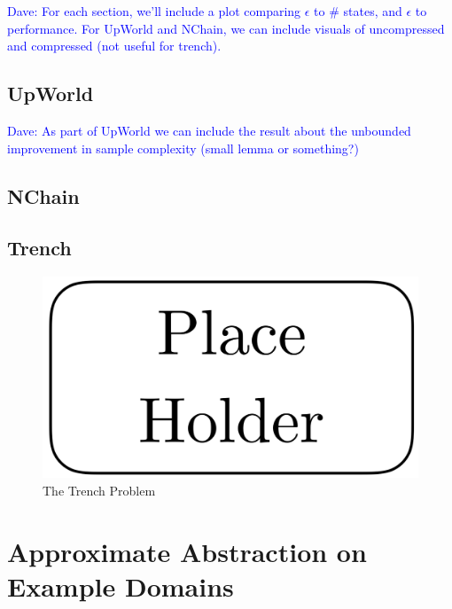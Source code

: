 \documentclass{article}
\newcommand\dnote[1]{\textcolor{blue}{Dave: #1}}
\begin{document}
\dnote{For each section, we'll include a plot comparing $\epsilon$ to \# states, and $\epsilon$ to performance. For UpWorld and NChain, we can include visuals of uncompressed and compressed (not useful for trench).}

\subsection{UpWorld}

\dnote{As part of UpWorld we can include the result about the unbounded improvement in sample complexity (small lemma or something?)}



\subsection{NChain}



\subsection{Trench}



\begin{figure}[h]
\centering
\includegraphics[width=0.42\columnwidth]{figures/placeholder.png}
\caption{The Trench Problem}
\label{fig:trench}
\end{figure}


\section{Approximate Abstraction on Example Domains}
\end{document}
